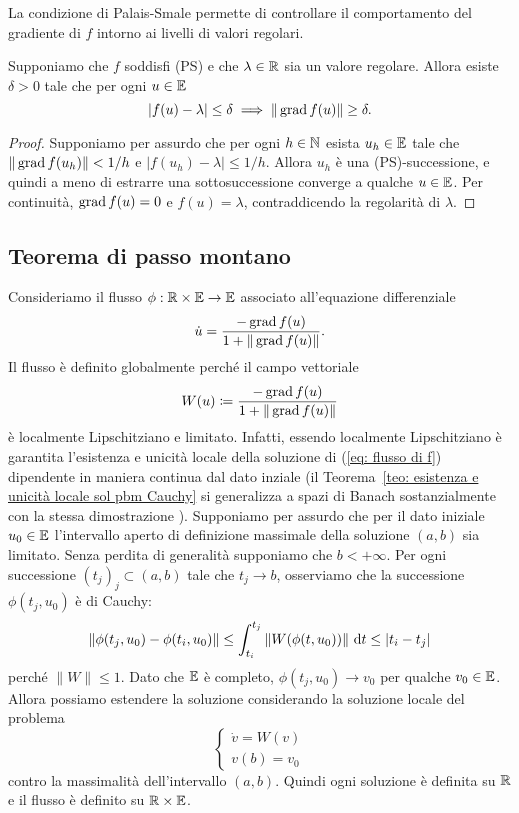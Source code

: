 	La condizione di Palais-Smale permette di controllare il comportamento del gradiente di \(f\) intorno ai livelli di valori regolari.
	
	\begin{lemma} \label{lemma: PS -> controllo sul gradiente}
		Supponiamo che \(f\) soddisfi (PS) e che \(\lambda \in \mathbb{R}\) sia un valore regolare. Allora esiste \(\delta >0\) tale che per ogni \(u \in \mathbb{E}\)
		\[
		|f(u)-\lambda| \leq \delta \implies \|\operatorname{grad} f(u)\| \geq \delta.
		\]
	\end{lemma}
	\begin{proof}
		Supponiamo per assurdo che per ogni \(h \in \mathbb{N}\) esista \(u_h \in \mathbb{E}\) tale che \(\|\operatorname{grad} f(u_h) \| < 1/h\) e \(|f(u_h)-\lambda | \leq 1/h\). Allora \(u_h\) è una (PS)-successione, e quindi a meno di estrarre una sottosuccessione converge a qualche \(u \in \mathbb{E}\). Per continuità, \(\operatorname{grad} f(u) =0\) e \(f(u)=\lambda\), contraddicendo la regolarità di \(\lambda\). 
	\end{proof}
	
	\subsection{Teorema di passo montano} \label{subs: MP Hilbert}
	
	Consideriamo il flusso \(\phi: \mathbb{R} \times \mathbb{E} \to \mathbb{E}\) associato all'equazione differenziale
	\begin{equation}\label{eq: flusso di f}
		\dot u = \frac{-\operatorname{grad} f(u)}{1+ \|\operatorname{grad} f (u)\|}.
	\end{equation}
	Il flusso è definito globalmente perché il campo vettoriale
	\[
	W(u) \coloneq \frac{-\operatorname{grad} f(u)}{1+ \|\operatorname{grad} f (u)\|}
	\]
	è localmente Lipschitziano e limitato. Infatti, essendo localmente Lipschitziano è garantita l'esistenza e unicità locale della soluzione di (\ref{eq: flusso di f}) dipendente in maniera continua dal dato inziale (il Teorema~\ref{teo: esistenza e unicità locale sol pbm Cauchy} si generalizza a spazi di Banach sostanzialmente con la stessa dimostrazione \cite{ambrosetti1967esistenza}). Supponiamo per assurdo che per il dato iniziale \(u_0 \in \mathbb{E}\) l'intervallo aperto di definizione massimale della soluzione \((a,b)\) sia limitato. Senza perdita di generalità supponiamo che \(b<+\infty\). Per ogni successione \((t_j)_j \subset (a,b)\) tale che \(t_j \to b\), osserviamo che la successione \(\phi(t_j,u_0)\) è di Cauchy:
	\[
	\|\phi(t_j,u_0) - \phi(t_i,u_0) \| \leq  \int_{t_i}^{t_j} \|W(\phi(t,u_0))\| \ \mathrm{d} t \leq |t_i-t_j|
	\]
	perché \(\|W\| \leq 1\). Dato che \(\mathbb{E}\) è completo,  \(\phi(t_j,u_0) \to v_0\) per qualche \(v_0 \in \mathbb{E}\). Allora possiamo estendere la soluzione considerando la soluzione locale del problema 
	\[
	\begin{cases}
		\dot v = W(v) \\
		v(b) = v_0
	\end{cases}
	\]
	contro la massimalità dell'intervallo \((a,b)\). Quindi ogni soluzione è definita su \(\mathbb{R}\) e il flusso è definito su \(\mathbb{R} \times \mathbb{E}\).
	
